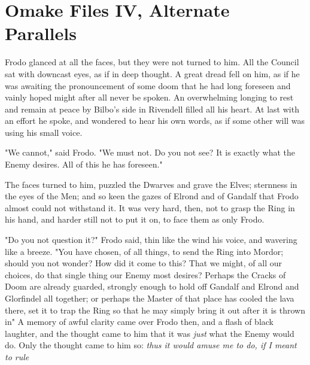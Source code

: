 \chapter{Omake Files IV, Alternate Parallels}


\noindent{}Frodo glanced at all the faces, but they were not turned to him. All the
Council sat with downcast eyes, as if in deep thought. A great dread fell on
him, as if he was awaiting the pronouncement of some doom that he had long
foreseen and vainly hoped might after all never be spoken. An overwhelming
longing to rest and remain at peace by Bilbo's side in Rivendell filled all his
heart. At last with an effort he spoke, and wondered to hear his own words, as
if some other will was using his small voice.

"We cannot," said Frodo. "We must not. Do you not see? It is exactly what the
Enemy desires. All of this he has foreseen."

The faces turned to him, puzzled the Dwarves and grave the Elves; sternness in
the eyes of the Men; and so keen the gazes of Elrond and of Gandalf that Frodo
almost could not withstand it. It was very hard, then, not to grasp the Ring in
his hand, and harder still not to put it on, to face them as only Frodo.

"Do you not question it?" Frodo said, thin like the wind his voice, and
wavering like a breeze. "You have chosen, of all things, to send the Ring into
Mordor; should you not wonder? How did it come to this? That we might, of all
our choices, do that single thing our Enemy most desires? Perhaps the Cracks of
Doom are already guarded, strongly enough to hold off Gandalf and Elrond and
Glorfindel all together; or perhaps the Master of that place has cooled the
lava there, set it to trap the Ring so that he may simply bring it out after it
is thrown in{\el}" A memory of awful clarity came over Frodo then, and a
flash of black laughter, and the thought came to him that it was \emph{just}
what the Enemy would do. Only the thought came to him so: \emph{thus it would
amuse me to do, if I meant to rule{\el}}

